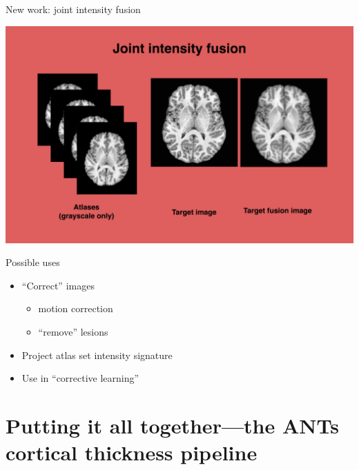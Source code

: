 \documentclass[ignorenonframetext,]{beamer}
\begin{document}
\begin{frame}{New work: joint intensity fusion}

\includegraphics{./tools/jointfusion/figures/jointIntensityFusion.png}

\end{frame}

\begin{frame}{Possible uses}

\begin{itemize}
\item
  ``Correct'' images

  \begin{itemize}
  \item
    motion correction
  \item
    ``remove'' lesions
  \end{itemize}
\item
  Project atlas set intensity signature
\item
  Use in ``corrective learning''
\end{itemize}

\end{frame}

\section{Putting it all together---the ANTs cortical thickness
pipeline}\label{putting-it-all-togetherthe-ants-cortical-thickness-pipeline}
\end{document}
